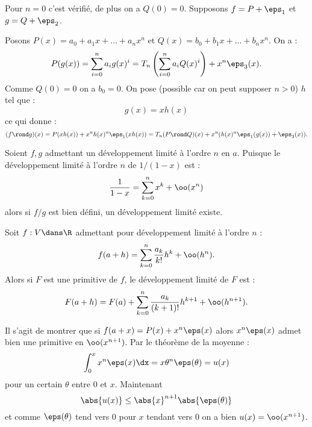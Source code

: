 \documentclass{mybourbaki}
\begin{document}
Pour $n=0$ c'est vérifié, de plus on a $Q(0) = 0$. Supposons $f = P + \eps_1$ et $g = Q + \eps_2$.

Posons $P(x) = a_0 + a_1 x +\ldots + a_nx^{n}$ et $Q(x) = b_0 + b_1 x +\ldots + b_nx^{n}$. On a : \[ P(g(x)) = \sum_{i=0}^{n}a_ig(x)^{i} = T_n\left(\sum_{i=0}^{n}a_iQ(x)^{i}\right) + x^{n}\eps_3(x).\]
Comme $Q(0) = 0$ on a $b_0 = 0$.
On pose (possible car on peut supposer $n>0$) $h$ tel que : \[g(x) = xh(x) \]ce qui donne : \[ (f\rond g)(x) = P(xh(x)) + x^{n}h(x)^{n}\eps_1(xh(x)) = T_n(P\rond Q)(x) + x^{n}(h(x)^{n}\eps_1(g(x))+\eps_3(x)).\]

\propt{}Soient $f,g$ admettant un développement limité à l'ordre $n$ en $a$. Puisque le développement limité à l'ordre $n$ de $1/(1-x)$ est : \[ \frac{1}{1-x}=\sum_{k=0}^{n} x^{k} + \oo(x^{n})\]alors si $f/g$ est bien défini, un développement limité existe.


\propt{}Soit $f : V\dans \R$ admettant pour développement limité à l'ordre $n$ : \[ f(a+h) = \sum_{k=0}^{n} \frac{a_k}{k!}h^{k}+ \oo(h^{n}). \]Alors si $F$ est une primitive de $f$, le développement limité de $F$ est : \[ F(a+h) = F(a) + \sum_{k=0}^{n}\frac{a_k}{(k+1)!}h^{k+1} + \oo(h^{n+1}).\]

Il s'agit de montrer que si $f(a+x) = P(x) + x^{n}\eps(x)$ alors $x^{n}\eps(x)$ admet bien une primitive en $\oo(x^{n+1})$. Par le théorème de la moyenne : \[ \int_{0}^{x}x^{n}\eps(x) \dx = x \theta^{n}\eps(\theta) = u(x)\]pour un certain $\theta$ entre $0$ et $x$. Maintenant \[ \abs{u(x)} \leq \abs{x}^{n+1}\abs{\eps(\theta)}\] et comme $\eps(\theta)$ tend vers $0$ pour $x$ tendant vers $0$ on a bien $u(x) = \oo(x^{n+1})$.
\end{document}
